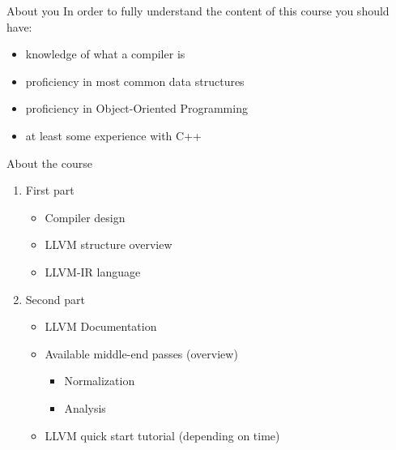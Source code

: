 \documentclass[10pt,mathserif]{beamer}
\begin{document}
\begin{frame}[t]{About you}
  In order to fully understand the content of this course you should have:
  \begin{itemize}
    \vfill
    \item knowledge of what a compiler is
    \vfill
    \item proficiency in most common data structures
    \vfill
    \item proficiency in Object-Oriented Programming
    \vfill
    \item at least some experience with C++
  \end{itemize}
\end{frame}

\begin{frame}[t]{About the course}
  \begin{Large}
  \vfill
  \begin{enumerate}
    \item First part
      \begin{itemize}
        \vfill
        \item Compiler design
        \vfill
        \item LLVM structure overview
        \vfill
        \item LLVM-IR language
    \end{itemize}
    \vfill
    \item Second part
      \begin{itemize}
        \item LLVM Documentation
        \vfill
        \item Available middle-end passes (overview)
        \vfill
        \begin{itemize}
          \item Normalization
        \vfill
          \item Analysis
        \end{itemize}
        \vfill
        \item LLVM quick start tutorial (depending on time)
      \end{itemize}
  \end{enumerate}
  \vfill
\end{Large}
\end{frame}
\end{document}
